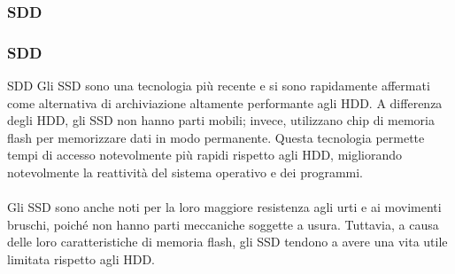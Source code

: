 \subsubsection[SDD]{SDD}
\begin{frame}
	\frametitle{SDD}
	  
	\begin{block}{SDD}
		Gli SSD sono una tecnologia più recente e si sono rapidamente affermati come alternativa di archiviazione altamente performante agli HDD. A differenza degli HDD, gli SSD non hanno parti mobili; invece, utilizzano chip di memoria flash per memorizzare dati in modo permanente. Questa tecnologia permette tempi di accesso notevolmente più rapidi rispetto agli HDD, migliorando notevolmente la reattività del sistema operativo e dei programmi.\\~\\
		Gli SSD sono anche noti per la loro maggiore resistenza agli urti e ai movimenti bruschi, poiché non hanno parti meccaniche soggette a usura. Tuttavia, a causa delle loro caratteristiche di memoria flash, gli SSD tendono a avere una vita utile limitata rispetto agli HDD.
	\end{block}
\end{frame}
